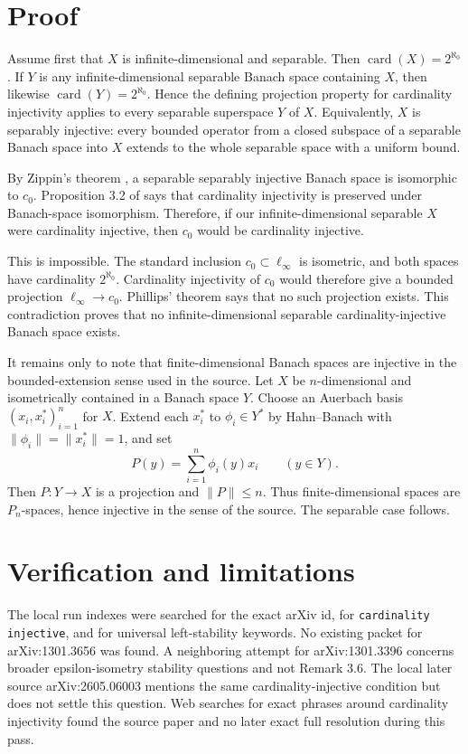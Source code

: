 \documentclass[11pt]{article}
\newcommand{\card}{\operatorname{card}}
\begin{document}
\section*{Proof}

Assume first that \(X\) is infinite-dimensional and separable.  Then
\(\card(X)=2^{\aleph_0}\).  If \(Y\) is any infinite-dimensional separable
Banach space containing \(X\), then likewise \(\card(Y)=2^{\aleph_0}\).  Hence
the defining projection property for cardinality injectivity applies to every
separable superspace \(Y\) of \(X\).  Equivalently, \(X\) is separably
injective: every bounded operator from a closed subspace of a separable Banach
space into \(X\) extends to the whole separable space with a uniform bound.

By Zippin's theorem \cite{Zippin}, a separable separably injective Banach
space is isomorphic to \(c_0\).  Proposition 3.2 of
\cite{BaoChengChengDai} says that cardinality injectivity is preserved under
Banach-space isomorphism.  Therefore, if our infinite-dimensional separable
\(X\) were cardinality injective, then \(c_0\) would be cardinality injective.

This is impossible.  The standard inclusion \(c_0\subset \ell_\infty\) is
isometric, and both spaces have cardinality \(2^{\aleph_0}\).  Cardinality
injectivity of \(c_0\) would therefore give a bounded projection
\(\ell_\infty\to c_0\).  Phillips' theorem \cite{Phillips} says that no such
projection exists.  This contradiction proves that no infinite-dimensional
separable cardinality-injective Banach space exists.

It remains only to note that finite-dimensional Banach spaces are injective
in the bounded-extension sense used in the source.  Let \(X\) be
\(n\)-dimensional and isometrically contained in a Banach space \(Y\).  Choose
an Auerbach basis \((x_i,x_i^*)_{i=1}^n\) for \(X\).  Extend each \(x_i^*\) to
\(\phi_i\in Y^*\) by Hahn--Banach with \(\|\phi_i\|=\|x_i^*\|=1\), and set
\[
  P(y)=\sum_{i=1}^n \phi_i(y)x_i \qquad (y\in Y).
\]
Then \(P:Y\to X\) is a projection and \(\|P\|\le n\).  Thus finite-dimensional
spaces are \(P_n\)-spaces, hence injective in the sense of the source.  The
separable case follows.

\section*{Verification and limitations}

The local run indexes were searched for the exact arXiv id, for
\texttt{cardinality injective}, and for universal left-stability keywords.
No existing packet for arXiv:1301.3656 was found.  A neighboring attempt for
arXiv:1301.3396 concerns broader epsilon-isometry stability questions and not
Remark 3.6.  The local later source arXiv:2605.06003 mentions the same
cardinality-injective condition but does not settle this question.  Web
searches for exact phrases around cardinality injectivity found the source
paper and no later exact full resolution during this pass.
\end{document}
